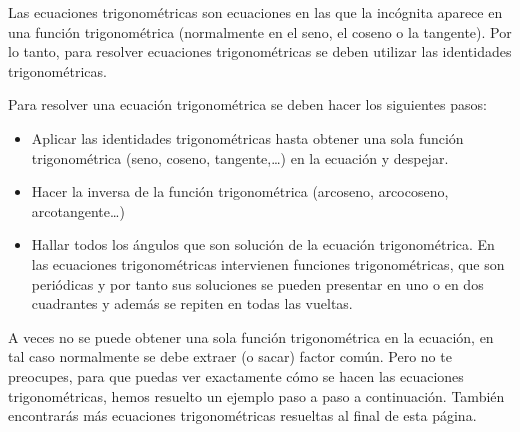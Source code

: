 Las ecuaciones trigonométricas son ecuaciones en las que la incógnita aparece en una función trigonométrica (normalmente en el seno, el coseno o la tangente). Por lo tanto, para resolver ecuaciones trigonométricas se deben utilizar las identidades trigonométricas.


Para resolver una ecuación trigonométrica se deben hacer los siguientes pasos:

\begin{itemize}
\item Aplicar las identidades trigonométricas hasta obtener una sola función trigonométrica (seno, coseno, tangente,…) en la ecuación y despejar.
\item Hacer la inversa de la función trigonométrica (arcoseno, arcocoseno, arcotangente…)
\item Hallar todos los ángulos que son solución de la ecuación trigonométrica. En las ecuaciones trigonométricas intervienen funciones trigonométricas, que son periódicas y por tanto sus soluciones se pueden presentar en uno o en dos cuadrantes y además se repiten en todas las vueltas.
\end{itemize}

A veces no se puede obtener una sola función trigonométrica en la ecuación, en tal caso normalmente se debe extraer (o sacar) factor común. Pero no te preocupes, para que puedas ver exactamente cómo se hacen las ecuaciones trigonométricas, hemos resuelto un ejemplo paso a paso a continuación. También encontrarás más ecuaciones trigonométricas resueltas al final de esta página.


